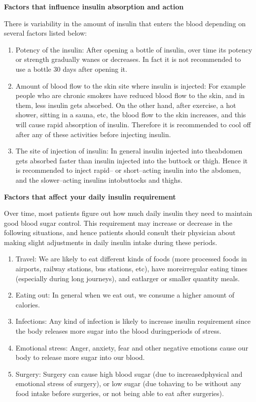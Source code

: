 \noindent\textbf{Factors that influence insulin absorption and action}

There is variability in the amount of insulin that enters the blood depending on several factors listed below:

\begin{enumerate}[•]
\itemsep=0pt
\item Potency of the insulin: After opening a bottle of insulin, over time its potency or strength gradually wanes or decreases. In fact it is not recommended to use a bottle 30 days after opening it.
\item Amount of blood flow to the skin site where insulin is injected: For example people who are chronic smokers have reduced blood flow to the skin, and in them, less insulin gets absorbed. On the other hand, after exercise, a hot shower, sitting in a sauna, etc, the blood flow to the skin increases, and this will cause rapid absorption of insulin. Therefore it is recommended to cool off after any of these activities before injecting insulin.
\item The site of injection of insulin: In general insulin injected into the\break abdomen gets absorbed faster than insulin injected into the buttock or thigh. Hence it is recommended to inject rapid– or short–acting insulin into the abdomen, and the slower–acting insulins into\break buttocks and thighs.
\end{enumerate}

\noindent\textbf{Factors that affect your daily insulin requirement}

Over time, most patients figure out how much daily insulin they need to maintain good blood sugar control. This requirement may increase or decrease in the following situations, and hence patients should consult their physician about making slight adjustments in daily insulin intake during these periods.

\begin{enumerate}[•]
\itemsep=0pt
\item Travel: We are likely to eat different kinds of foods (more processed foods in airports, railway stations, bus stations, etc), have more\break irregular eating times (especially during long journeys), and eat\break larger or smaller quantity meals.
\item Eating out: In general when we eat out, we consume a higher amount of calories.
\item Infections: Any kind of infection is likely to increase insulin requirement since the body releases more sugar into the blood during\break periods of stress.
\item Emotional stress: Anger, anxiety, fear and other negative emotions cause our body to release more sugar into our blood.
\item Surgery: Surgery can cause high blood sugar (due to increased\break physical and emotional stress of surgery), or low sugar (due to\break having to be without any food intake before surgeries, or not being able to eat after surgeries).
\end{enumerate}

